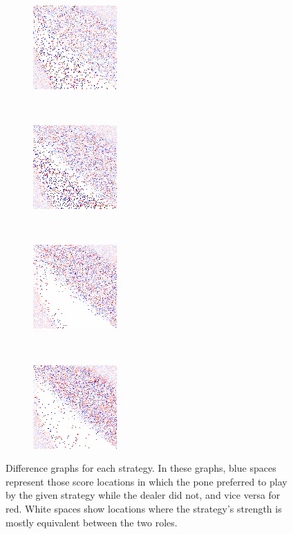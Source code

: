 \begin{figure}
	\begin{subfigure}[t]{0.22\textwidth}
		\includegraphics[width=\stratgraphwidth]{images/findings/round1/diff/crib_min_avg.png}
		\caption{\cribminavg}
	\end{subfigure}
	~
	\begin{subfigure}[t]{0.22\textwidth}
		\includegraphics[width=\stratgraphwidth]{images/findings/round1/diff/pegging_max_avg_gained.png}
		\caption{\peggingmaxavggained}
	\end{subfigure}
~
	\begin{subfigure}[t]{0.22\textwidth}
		\includegraphics[width=\stratgraphwidth]{images/findings/round1/diff/pegging_max_med_gained.png}
		\caption{\peggingmaxmedgained}
	\end{subfigure}
	~
	\begin{subfigure}[t]{0.22\textwidth}
		\includegraphics[width=\stratgraphwidth]{images/findings/round1/diff/pegging_min_avg_given.png}
		\caption{\peggingminavggiven}
	\end{subfigure}

\caption{
	Difference graphs for each strategy.
	In these graphs,
	blue spaces represent those score locations
		in which the pone preferred to play by the given strategy
		while the dealer did not,
	and vice versa for red.
	White spaces show locations where the strategy's strength is
	mostly equivalent between the two roles.
}
\label{fig:r1-diff}
\end{figure}

